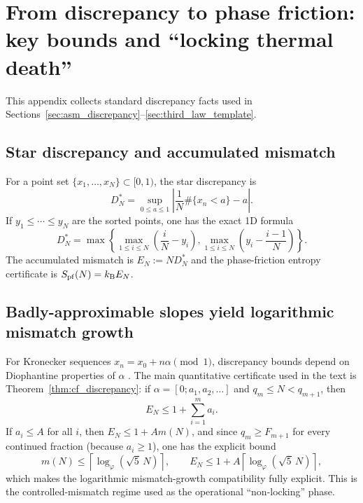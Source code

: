 \section{From discrepancy to phase friction: key bounds and ``locking thermal death''}
\label{app:discrepancy_pf}

This appendix collects standard discrepancy facts used in Sections~\ref{sec:asm_discrepancy}--\ref{sec:third_law_template}.

\subsection{Star discrepancy and accumulated mismatch}
\label{app:star_discrepancy}

For a point set $\{x_1,\dots,x_N\}\subset[0,1)$, the star discrepancy is
\begin{equation}
  D_N^\ast = \sup_{0\le a\le 1}\left|\frac{1}{N}\#\{x_n<a\}-a\right|.
\end{equation}
If $y_1\le \cdots \le y_N$ are the sorted points, one has the exact 1D formula
\begin{equation}
  D_N^\ast
  = \max\left\{\max_{1\le i\le N}\left(\frac{i}{N}-y_i\right),
             \max_{1\le i\le N}\left(y_i-\frac{i-1}{N}\right)\right\}.
  \label{eq:Dstar_sorted_formula}
\end{equation}
The accumulated mismatch is $E_N := N D_N^\ast$ and the phase-friction entropy certificate is $S_{\mathrm{pf}}(N)=k_{\mathrm{B}} E_N$.

\subsection{Badly-approximable slopes yield logarithmic mismatch growth}
\label{app:ba_log}

For Kronecker sequences $x_n=x_0+n\alpha\pmod 1$, discrepancy bounds depend on Diophantine properties of $\alpha$ \cite{KuipersNiederreiter1974,Cassels1957,DrmotaTichy1997}.
The main quantitative certificate used in the text is Theorem~\ref{thm:cf_discrepancy}: if $\alpha=[0;a_1,a_2,\dots]$ and $q_m\le N<q_{m+1}$, then
\begin{equation}
  E_N \le 1+\sum_{i=1}^m a_i.
\end{equation}
If $a_i\le A$ for all $i$, then $E_N\le 1+Am(N)$, and since $q_m\ge F_{m+1}$ for every continued fraction (because $a_i\ge 1$), one has the explicit bound
\begin{equation}
  m(N)\le \left\lceil \log_{\varphi}\!\left(\sqrt{5}\,N\right)\right\rceil,
  \qquad
  E_N \le 1 + A\left\lceil \log_{\varphi}\!\left(\sqrt{5}\,N\right)\right\rceil,
\end{equation}
which makes the logarithmic mismatch-growth compatibility fully explicit.
This is the controlled-mismatch regime used as the operational ``non-locking'' phase.

